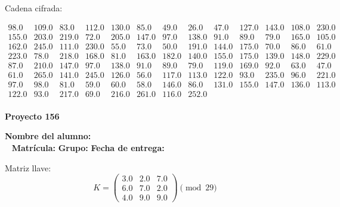 \documentclass[12pt]{article}
\begin{document}
Cadena cifrada:
\begin{center}
$\begin{array}{lllllllllllll}
98.0 & 109.0 & 83.0 & 112.0 & 130.0 & 85.0 & 49.0 & 26.0 & 47.0 & 127.0 & 143.0 & 108.0 & 230.0\\
155.0 & 203.0 & 219.0 & 72.0 & 205.0 & 147.0 & 97.0 & 138.0 & 91.0 & 89.0 & 79.0 & 165.0 & 105.0\\
162.0 & 245.0 & 111.0 & 230.0 & 55.0 & 73.0 & 50.0 & 191.0 & 144.0 & 175.0 & 70.0 & 86.0 & 61.0\\
223.0 & 78.0 & 218.0 & 168.0 & 81.0 & 163.0 & 182.0 & 140.0 & 155.0 & 175.0 & 139.0 & 148.0 & 229.0\\
87.0 & 210.0 & 147.0 & 97.0 & 138.0 & 91.0 & 89.0 & 79.0 & 119.0 & 169.0 & 92.0 & 63.0 & 47.0\\
61.0 & 265.0 & 141.0 & 245.0 & 126.0 & 56.0 & 117.0 & 113.0 & 122.0 & 93.0 & 235.0 & 96.0 & 221.0\\
97.0 & 98.0 & 81.0 & 59.0 & 60.0 & 58.0 & 146.0 & 86.0 & 131.0 & 155.0 & 147.0 & 136.0 & 113.0\\
122.0 & 93.0 & 217.0 & 69.0 & 216.0 & 261.0 & 116.0 & 252.0\\
\end{array}$
\end{center}

\newpage


\textbf{Proyecto 156}

\textbf{Nombre del alumno:} \underline{\hspace{13cm}}\\\
\vspace{1cm}
\textbf{Matrícula:} \underline{\hspace{4cm}} \hspace{1cm}
\textbf{Grupo:} \underline{\hspace{2cm}}
\textbf{Fecha de entrega:} \underline{\hspace{2cm}}

\medskip

Matriz llave:
\[
K = \begin{pmatrix}
3.0 & 2.0 & 7.0\\
6.0 & 7.0 & 2.0\\
4.0 & 9.0 & 9.0
\end{pmatrix} \pmod{29}
\]
\end{document}

